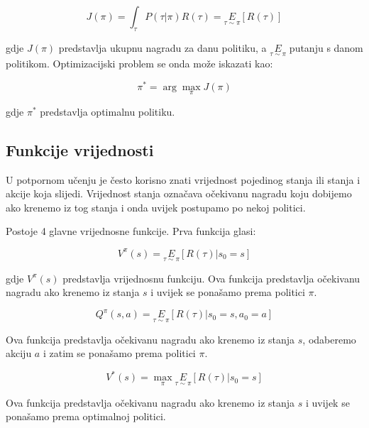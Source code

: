 \documentclass[times,utf8,diplomski]{fer}
\begin{document}
\begin{equation}
	\label{ukupna nagrada}
	J(\pi) = \int_{\tau} P(\tau|\pi) R(\tau) = \underset{\tau\sim \pi} E[{R(\tau)}]
\end{equation}

\noindent gdje ${J(\pi)}$ predstavlja ukupnu nagradu za danu politiku, a ${\underset{\tau\sim \pi}E}$ putanju s danom politikom. Optimizacijski problem se onda može iskazati kao:

\begin{equation}
	\label{optimizacijski problem}
	\pi^* = \arg \max_{\pi} J(\pi)
\end{equation}

\noindent gdje ${\pi^*}$ predstavlja optimalnu politiku.

\subsection{Funkcije vrijednosti}

U potpornom učenju je često korisno znati vrijednost pojedinog stanja ili stanja i akcije koja slijedi. Vrijednost stanja označava očekivanu nagradu koju dobijemo ako krenemo iz tog stanja i onda uvijek postupamo po nekoj politici.

Postoje 4 glavne vrijednosne funkcije. Prva funkcija glasi:

\begin{equation}
	\label{prva vrijednosna}
	V^{\pi}(s) = \underset{\tau \sim \pi} E [{R(\tau)\left| s_0 = s\right.}]
\end{equation}

\noindent gdje ${V^{\pi}(s)}$ predstavlja vrijednosnu funkciju. Ova funkcija predstavlja očekivanu nagradu ako krenemo iz stanja ${s}$ i uvijek se ponašamo prema politici ${\pi}$.


\begin{equation}
	\label{druga vrijednosna}
	Q^{\pi}(s,a) = \underset{\tau \sim \pi}E[{R(\tau)\left| s_0 = s, a_0 = a\right.}]
\end{equation}

\noindent Ova funkcija predstavlja očekivanu nagradu ako krenemo iz stanja ${s}$, odaberemo akciju ${a}$ i zatim se ponašamo prema politici ${\pi}$.

\begin{equation}
	\label{treća vrijednosna}
	V^*(s) = \max_{\pi} \underset{\tau \sim \pi}E[{R(\tau)\left| s_0 = s\right.}]
\end{equation}

\noindent Ova funkcija predstavlja očekivanu nagradu ako krenemo iz stanja ${s}$ i uvijek se ponašamo prema optimalnoj politici.
\end{document}
